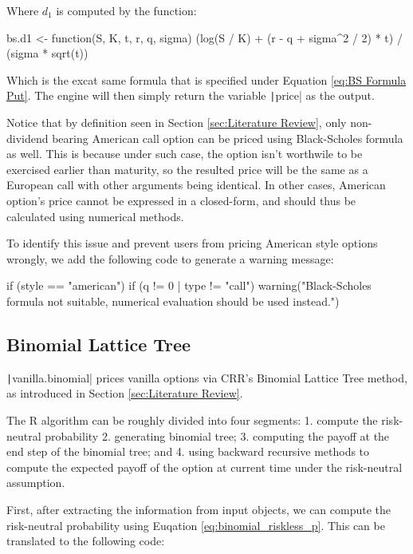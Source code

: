 Where $d_1$ is computed by the function:

\begin{Rminted}
bs.d1 <- function(S, K, t, r, q, sigma) {
    (log(S / K) + (r - q + sigma^2 / 2) * t) / (sigma * sqrt(t))
}
\end{Rminted}

Which is the excat same formula that is specified under Equation \ref{eq:BS Formula Put}. The engine will then simply return the variable \texttt|price| as the output.

Notice that by definition seen in Section \ref{sec:Literature Review}, only non-dividend bearing American call option can be priced using Black-Scholes formula as well. This is because under such case, the option isn't worthwile to be exercised earlier than maturity, so the resulted price will be the same as a European call with other arguments being identical. In other cases, American option's price cannot be expressed in a closed-form, and should thus be calculated using numerical methods.

To identify this issue and prevent users from pricing American style options wrongly, we add the following code to generate a warning message:

\begin{Rminted}
if (style == "american") {
    if (q != 0 | type != "call") {
        warning("Black-Scholes formula not suitable, numerical evaluation should be used instead.")
    }
}
\end{Rminted}

\subsection{Binomial Lattice Tree}

\texttt|vanilla.binomial| prices vanilla options via CRR's Binomial Lattice Tree method, as introduced in Section \ref{sec:Literature Review}.

The R algorithm can be roughly divided into four segments: 1. compute the risk-neutral probability 2. generating binomial tree; 3. computing the payoff at the end step of the binomial tree; and 4. using backward recursive methods to compute the expected payoff of the option at current time under the risk-neutral assumption.

First, after extracting the information from input objects, we can compute the risk-neutral probability using Euqation \ref{eq:binomial_riskless_p}. This can be translated to the following code:

